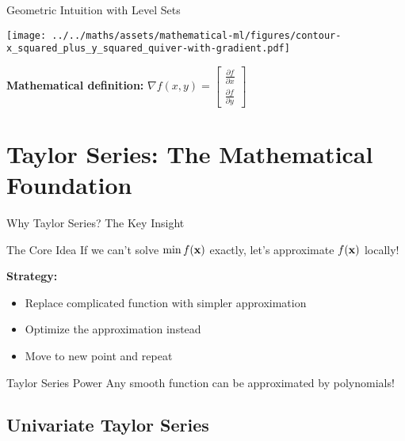 \documentclass[usenames,dvipsnames]{beamer}
\begin{document}
  \begin{frame}{Geometric Intuition with Level Sets}
    \begin{center}
    \texttt{[image: ../../maths/assets/mathematical-ml/figures/contour-x\_squared\_plus\_y\_squared\_quiver-with-gradient.pdf]}
    \end{center}
    
    \pause
    \textbf{Mathematical definition:} $\nabla f(x, y) = \begin{bmatrix} \frac{\partial f}{\partial x} \\ \frac{\partial f}{\partial y} \end{bmatrix}$
  \end{frame}

  \section{Taylor Series: The Mathematical Foundation}

  \begin{frame}{Why Taylor Series? The Key Insight}
    \begin{examplebox}{The Core Idea}
    {\small If we can't solve $\min f(\mathbf{x})$ exactly, let's approximate $f(\mathbf{x})$ locally!}
    \end{examplebox}
    
    \pause
    \textbf{Strategy:}
    \begin{itemize}[<+->]
        \item Replace complicated function with simpler approximation
        \item Optimize the approximation instead
        \item Move to new point and repeat
    \end{itemize}
    
    \pause
    \begin{alertbox}{Taylor Series Power}
    Any smooth function can be approximated by polynomials!
    \end{alertbox}
  \end{frame}

  \subsection{Univariate Taylor Series}
\end{document}
